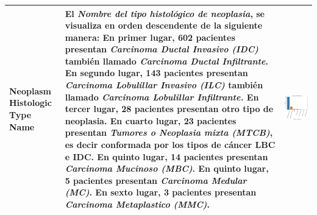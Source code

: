 \begin{table}[!htb]
\begin{threeparttable}
\begin{tabular}{p{2.5cm} p{7cm} p{6.5cm}}
			Neoplasm Histologic Type Name
			& El \textit{Nombre del tipo histológico de neoplasia}, se visualiza en orden descendente de la siguiente manera: En primer lugar, 602 pacientes presentan \textit{Carcinoma Ductal Invasivo (IDC)} también llamado \textit{Carcinoma Ductal Infiltrante}. En segundo lugar, 143 pacientes presentan \textit{Carcinoma Lobulillar Invasivo (ILC)} también llamado \textit{Carcinoma Lobulillar Infiltrante.} En tercer lugar, 28 pacientes presentan otro tipo de neoplasia. En cuarto lugar, 23 pacientes presentan \textit{Tumores o Neoplasia mixta (MTCB)}, es decir conformada por los tipos de cáncer LBC e IDC. En quinto lugar, 14 pacientes presentan \textit{Carcinoma Mucinoso (MBC)}. En quinto lugar, 5 pacientes presentan \textit{Carcinoma Medular (MC)}. En sexto lugar, 3 pacientes presentan \textit{Carcinoma Metaplastico (MMC)}.
			& \begin{center}\includegraphics[width=1\linewidth]{NOTEBOOK/IMAGENES_DESCRIPTIVAS/22_neoplasm_histologic_type}\end{center}
			\\ \hline
		\end{tabular}
	\end{threeparttable}
\end{table}


